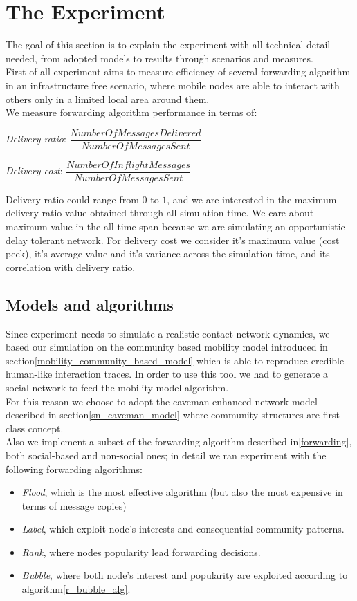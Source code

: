 \newpage
\section{The Experiment}
\label{experiment}

The goal of this section is to explain the experiment with all technical detail needed, from adopted models to results through scenarios and measures.\\
First of all experiment aims to measure efficiency of several forwarding algorithm in an infrastructure free scenario, where mobile nodes are able to interact with others only in a limited local area around them. \\
We measure forwarding algorithm performance in terms of:
\begin{list}{}
\item \emph{Delivery ratio}: $ \dfrac{Number Of Messages Delivered}{ Number Of Messages Sent } $ 
\item \emph{Delivery cost}:  $ \dfrac{Number Of Inflight Messages }{ Number Of Messages Sent } $
\end{list}
Delivery ratio could range from $0$ to $1$, and we are interested in the maximum delivery ratio value obtained through all simulation time. We care about maximum value in the all time span because we are simulating an opportunistic delay tolerant network. For delivery cost we consider it's maximum value (cost peek), it's average value and it's variance across the simulation time, and its correlation with delivery ratio.\\ 

\subsection{Models and algorithms}
\label{exp_incarnation}
Since experiment needs to simulate a realistic contact network dynamics, we based our simulation on the community based mobility model introduced in section\ref{mobility_community_based_model} which is able to reproduce credible human-like interaction traces. In order to use this tool we had to generate a social-network to feed the mobility model algorithm.\\
For this reason we choose to adopt the caveman enhanced network model described in section\ref{sn_caveman_model} where community structures are first class concept.\\
Also we implement a subset of the forwarding algorithm described in\ref{forwarding}, both social-based and non-social ones; in detail we ran experiment with the following forwarding algorithms:
\begin{itemize}
\item \emph{Flood}, which is the most effective algorithm (but also the most expensive in terms of message copies)
\item \emph{Label}, which exploit node's interests and consequential community patterns.
\item \emph{Rank}, where nodes popularity lead forwarding decisions.
\item \emph{Bubble}, where both node's interest and popularity are exploited according to algorithm\ref{r_bubble_alg}.
\end{itemize}

